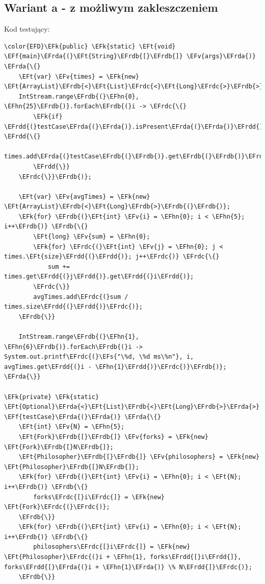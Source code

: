 \documentclass[11pt]{article}
\newcommand{\EFs}[1]{\textcolor{EFs}{#1}} %
\newcommand{\EFk}[1]{\textcolor{EFk}{#1}} %
\newcommand{\EFf}[1]{\textcolor{EFf}{#1}} %
\newcommand{\EFv}[1]{\textcolor{EFv}{#1}} %
\newcommand{\EFt}[1]{\textcolor{EFt}{#1}} %
\newcommand{\EFhn}[1]{\textcolor{EFhn}{#1}} %
\newcommand{\EFrda}[1]{\textcolor{EFrda}{#1}} %
\newcommand{\EFrdb}[1]{\textcolor{EFrdb}{#1}} %
\newcommand{\EFrdc}[1]{\textcolor{EFrdc}{#1}} %
\newcommand{\EFrdd}[1]{\textcolor{EFrdd}{#1}} %
\begin{document}
\subsection*{Wariant a - z możliwym zakleszczeniem}
\label{sec:orgea9e5ff}
Kod testujący:
\begin{Code}
\begin{Verbatim}
\color{EFD}\EFk{public} \EFk{static} \EFt{void} \EFf{main}\EFrda{(}\EFt{String}\EFrdb{[}\EFrdb{]} \EFv{args}\EFrda{)} \EFrda{\{}
    \EFt{var} \EFv{times} = \EFk{new} \EFt{ArrayList}\EFrdb{<}\EFt{List}\EFrdc{<}\EFt{Long}\EFrdc{>}\EFrdb{>}\EFrdb{(}\EFrdb{)};
    IntStream.range\EFrdb{(}\EFhn{0}, \EFhn{25}\EFrdb{)}.forEach\EFrdb{(}i -> \EFrdc{\{}
        \EFk{if} \EFrdd{(}testCase\EFrda{(}\EFrda{)}.isPresent\EFrda{(}\EFrda{)}\EFrdd{)} \EFrdd{\{}
            times.add\EFrda{(}testCase\EFrdb{(}\EFrdb{)}.get\EFrdb{(}\EFrdb{)}\EFrda{)};
        \EFrdd{\}}
    \EFrdc{\}}\EFrdb{)};

    \EFt{var} \EFv{avgTimes} = \EFk{new} \EFt{ArrayList}\EFrdb{<}\EFt{Long}\EFrdb{>}\EFrdb{(}\EFrdb{)};
    \EFk{for} \EFrdb{(}\EFt{int} \EFv{i} = \EFhn{0}; i < \EFhn{5}; i++\EFrdb{)} \EFrdb{\{}
        \EFt{long} \EFv{sum} = \EFhn{0};
        \EFk{for} \EFrdc{(}\EFt{int} \EFv{j} = \EFhn{0}; j < times.\EFt{size}\EFrdd{(}\EFrdd{)}; j++\EFrdc{)} \EFrdc{\{}
            sum += times.get\EFrdd{(}j\EFrdd{)}.get\EFrdd{(}i\EFrdd{)};
        \EFrdc{\}}
        avgTimes.add\EFrdc{(}sum / times.size\EFrdd{(}\EFrdd{)}\EFrdc{)};
    \EFrdb{\}}

    IntStream.range\EFrdb{(}\EFhn{1}, \EFhn{6}\EFrdb{)}.forEach\EFrdb{(}i -> System.out.printf\EFrdc{(}\EFs{"\%d, \%d ms\%n"}, i, avgTimes.get\EFrdd{(}i - \EFhn{1}\EFrdd{)}\EFrdc{)}\EFrdb{)};
\EFrda{\}}

\EFk{private} \EFk{static} \EFt{Optional}\EFrda{<}\EFt{List}\EFrdb{<}\EFt{Long}\EFrdb{>}\EFrda{>} \EFf{testCase}\EFrda{(}\EFrda{)} \EFrda{\{}
    \EFt{int} \EFv{N} = \EFhn{5};
    \EFt{Fork}\EFrdb{[}\EFrdb{]} \EFv{forks} = \EFk{new} \EFt{Fork}\EFrdb{[}N\EFrdb{]};
    \EFt{Philosopher}\EFrdb{[}\EFrdb{]} \EFv{philosophers} = \EFk{new} \EFt{Philosopher}\EFrdb{[}N\EFrdb{]};
    \EFk{for} \EFrdb{(}\EFt{int} \EFv{i} = \EFhn{0}; i < \EFt{N}; i++\EFrdb{)} \EFrdb{\{}
        forks\EFrdc{[}i\EFrdc{]} = \EFk{new} \EFt{Fork}\EFrdc{(}\EFrdc{)};
    \EFrdb{\}}
    \EFk{for} \EFrdb{(}\EFt{int} \EFv{i} = \EFhn{0}; i < \EFt{N}; i++\EFrdb{)} \EFrdb{\{}
        philosophers\EFrdc{[}i\EFrdc{]} = \EFk{new} \EFt{Philosopher}\EFrdc{(}i + \EFhn{1}, forks\EFrdd{[}i\EFrdd{]}, forks\EFrdd{[}\EFrda{(}i + \EFhn{1}\EFrda{)} \% N\EFrdd{]}\EFrdc{)};
    \EFrdb{\}}


\end{Verbatim}
\end{Code}
\end{document}
